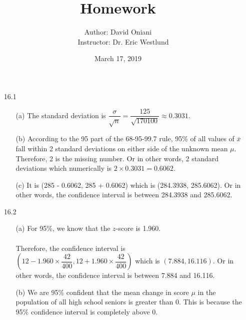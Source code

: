 \documentclass[11pt, a4paper]{article}
\title{\bf{Homework \textnumero 11}}
\author{Author: David Oniani
\\
\ \ \ Instructor: Dr. Eric Westlund}
\date{March 17, 2019}
\begin{document}
\maketitle
\begin{itemize}
\item[16.1]
\begin{itemize}
\item[(a)]
The standard deviation is $\dfrac{\sigma}{\sqrt{n}} = \dfrac{125}{\sqrt{170100}} \approx 0.3031$.

\item[]

\item[(b)]
According to the 95 part of the 68-95-99.7 rule, 95\% of all values
of $\overline{x}$ fall within 2 standard deviations on either side of the unknown
mean $\mu$. Therefore, 2 is the missing number. Or in other words, 2 standard deviations
which numerically is $2 \times 0.3031 = 0.6062$.

\item[]

\item[(c)]
It is (285 - 0.6062, 285 + 0.6062) which is (284.3938, 285.6062).
Or in other words, the confidence interval is between 284.3938 and 285.6062.
\end{itemize}

\item[]
\item[]

\item[16.2]
\begin{itemize}
\item[(a)]
For 95\%, we know that the $z$-score is 1.960.\\\\
Therefore, the confidence interval is $(12 - 1.960 \times \dfrac{42}{400}, 12 + 1.960 \times \dfrac{42}{400})$
which is $(7.884, 16.116)$. Or in other words, the confidence interval
is between 7.884 and 16.116.

\item[]

\item[(b)]
We are 95\% confident that the mean change in score $\mu$ in the population of all high
school seniors is greater than 0. This is because the 95\% confidence interval is completely
above 0.
\end{itemize}

\item[]
\item[]


\end{itemize}
\end{document}
